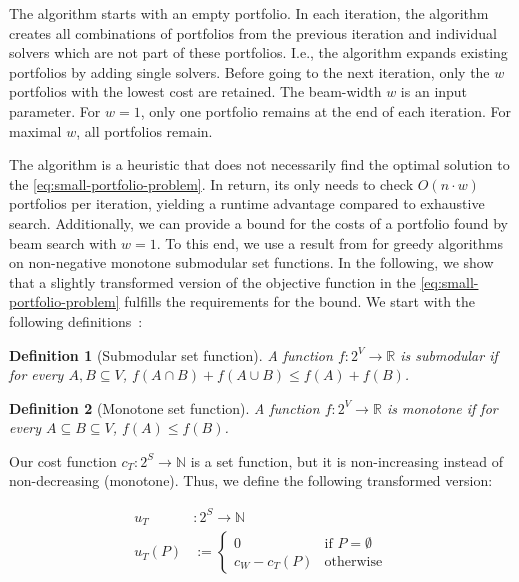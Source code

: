 \documentclass[conference]{IEEEtran}
\newtheorem{definition}{Definition}
\begin{document}
The algorithm starts with an empty portfolio.
In each iteration, the algorithm creates all combinations of portfolios from the previous iteration and individual solvers which are not part of these portfolios.
I.e., the algorithm expands existing portfolios by adding single solvers.
Before going to the next iteration, only the $w$ portfolios with the lowest cost are retained.
The beam-width $w$ is an input parameter.
For $w=1$, only one portfolio remains at the end of each iteration.
For maximal $w$, all portfolios remain.

The algorithm is a heuristic that does not necessarily find the optimal solution to the \ref{eq:small-portfolio-problem}.
In return, its only needs to check $O(n \cdot w)$ portfolios per iteration, yielding a runtime advantage compared to exhaustive search.
Additionally, we can provide a bound for the costs of a portfolio found by beam search with $w=1$.
To this end, we use a result from \cite{nemhauser1978analysis} for greedy algorithms on non-negative monotone submodular set functions.
In the following, we show that a slightly transformed version of the objective function in the \ref{eq:small-portfolio-problem} fulfills the requirements for the bound.
We start with the following definitions~\cite{krause2014submodular}:

\begin{definition}[Submodular set function]
	A function $f : 2^V \rightarrow \mathbb{R}$ is submodular if for every $A, B \subseteq V$, $f(A \cap B) + f(A \cup B) \leq f(A) + f(B)$.
	\label{def:submodular}
\end{definition}

\begin{definition}[Monotone set function]
	A function $f : 2^V \rightarrow \mathbb{R}$ is monotone if for every $A \subseteq B \subseteq V$, $f(A) \leq f(B)$.
	\label{def:monotone}
\end{definition}

Our cost function $c_{T}: 2^S \rightarrow \mathbb{N}$ is a set function, but it is non-increasing instead of non-decreasing (monotone).
Thus, we define the following transformed version:

\begin{align*}
	u_{T} &: 2^S \rightarrow \mathbb{N}\\
	u_{T}(P) &:= \begin{cases}
		0 & \text{if }P=\emptyset\\
		c_W - c_{T}(P) & \text{otherwise}
	\end{cases} \tag*{Portfolio Utility}
\end{align*}
\end{document}
